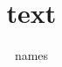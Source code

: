 \documentclass[english,ngerman,
]{tudscrposter}
\begin{document}
\author{names}
\title{text}
\subject{text}
\titlehead{head}
%

\maketitle


\blinddocument
\end{document}
